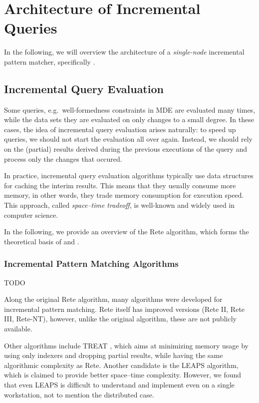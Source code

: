 \section{Architecture of Incremental Queries}
\label{sec:architecture}

In the following, we will overview the architecture of a \emph{single-node} incremental pattern matcher, specifically \eiq{}.


\subsection{Incremental Query Evaluation}
\label{rete}

Some queries, e.g.\ well-formedness constraints in MDE are evaluated many times, while the data sets they are evaluated on only changes to a small degree. In these cases, the idea of incremental query evaluation arises naturally: to speed up queries, we should not start the evaluation all over again. Instead, we should rely on the (partial) results derived during the previous executions of the query and process only the changes that occured.
 
In practice, incremental query evaluation algorithms typically use data structures for caching the interim results. This  means that they usually consume more memory, in other words, they trade memory consumption for execution speed. This approach, called \emph{space--time tradeoff}, is well-known and widely used in computer science.

In the following, we provide an overview of the Rete algorithm, which forms the theoretical basis of \eiq{} and \iqd{}.

\subsubsection{Incremental Pattern Matching Algorithms}

TODO

Along the original Rete algorithm, many algorithms were developed for incremental pattern matching. Rete itself has improved versions (Rete II, Rete III, Rete-NT), however, unlike the original algorithm, these are not publicly available. 

Other algorithms include TREAT \cite{Miranker:1991:OPT:627280.627434}, which aims at minimizing memory usage by using only indexers and dropping partial results, while having the same algorithmic complexity as Rete. Another candidate is the LEAPS \cite{Batory:1994:LA:899216} algorithm, which is claimed to provide better space--time complexity. However, we found that even LEAPS is difficult to understand and implement even on a single workstation, not to mention the distributed case. 


